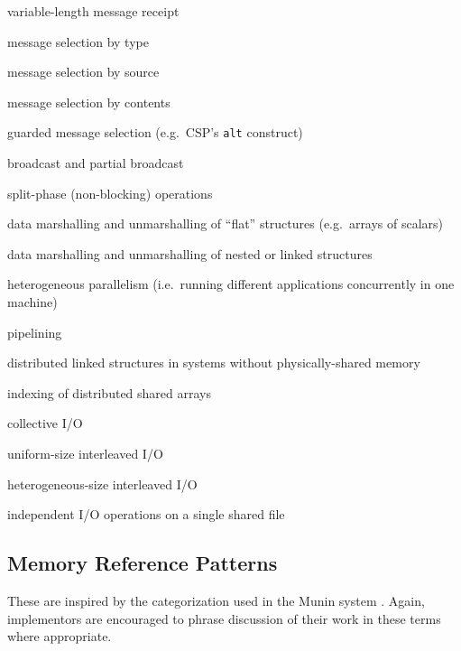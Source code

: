 \begin{small}
\begin{toylist}
\item	variable-length message receipt
\item	message selection by type
\item	message selection by source
\item	message selection by contents
\item	guarded message selection (e.g.\ CSP's {\tt{alt}} construct)
\item	broadcast and partial broadcast
\item	split-phase (non-blocking) operations
\item	data marshalling and unmarshalling of ``flat'' structures (e.g.\ arrays of scalars)
\item	data marshalling and unmarshalling of nested or linked structures
\item	heterogeneous parallelism (i.e.\ running different applications concurrently in one machine)
\item	pipelining
\item	distributed linked structures in systems without physically-shared memory
\item	indexing of distributed shared arrays
\item	collective I/O
\item	uniform-size interleaved I/O
\item	heterogeneous-size interleaved I/O
\item	independent I/O operations on a single shared file
\end{toylist}
\end{small}

\subsection{Memory Reference Patterns\label{s:cliche-memref}}

These are inspired by the categorization used in the Munin system \cite{b:munin-overview}.
Again, implementors are encouraged to phrase discussion of their work in these terms where appropriate.


